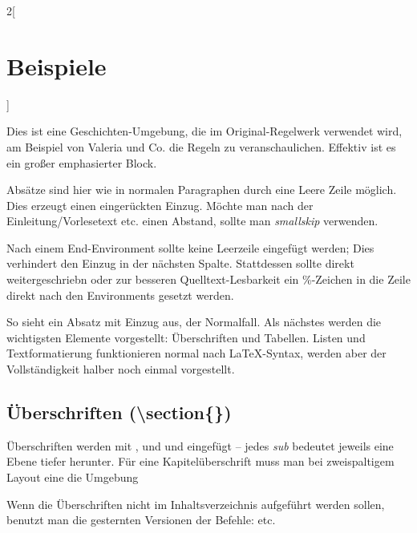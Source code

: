 \documentclass[linksbund]{rpg-ilaris}
\begin{document}
\begin{multicols}{2}[        %
		\chapter{Beispiele}  %
		]                    %

\begin{geschichte}
	Dies ist eine Geschichten-Umgebung, die im Original-Regelwerk verwendet wird, am Beispiel von Valeria und Co. die Regeln zu veranschaulichen. Effektiv ist es ein großer emphasierter Block.

	Absätze sind hier wie in normalen Paragraphen durch eine Leere Zeile möglich. Dies erzeugt einen eingerückten Einzug. Möchte man nach der Einleitung/Vorlesetext etc. einen Abstand, sollte man \emph{smallskip} verwenden.
\end{geschichte}

Nach einem End-Environment sollte keine Leerzeile eingefügt werden; Dies verhindert den Einzug in der nächsten Spalte. Stattdessen sollte direkt weitergeschriebn oder zur besseren Quelltext-Lesbarkeit ein \%-Zeichen in die Zeile direkt nach den Environments gesetzt werden.

So sieht ein Absatz mit Einzug aus, der Normalfall. Als nächstes werden die wichtigsten Elemente vorgestellt: Überschriften und Tabellen. Listen und Textformatierung funktionieren normal nach \LaTeX-Syntax, werden aber der Vollständigkeit halber noch einmal vorgestellt.


	\section[Überschriften]{Überschriften (\textbackslash{}section\{\})}
	Überschriften werden mit ,  und  und  eingefügt -- jedes \emph{sub} bedeutet jeweils eine Ebene tiefer herunter.
	Für eine Kapitelüberschrift muss man bei zweispaltigem Layout eine  die Umgebung  

	Wenn die Überschriften nicht im Inhaltsverzeichnis aufgeführt werden sollen, benutzt man die gesternten Versionen der Befehle:  etc.

\end{multicols}
\end{document}
